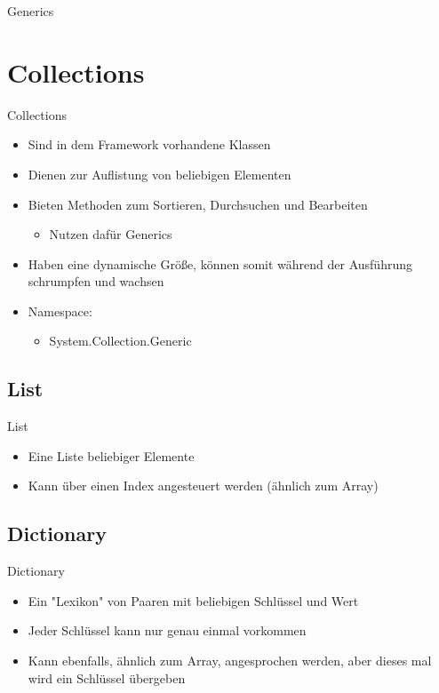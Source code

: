 \begin{frame}{Generics}
	
	
\end{frame}

\section{Collections}
\begin{frame}{Collections}
	\begin{itemize}
		\item Sind in dem Framework vorhandene Klassen
		\item Dienen zur Auflistung von beliebigen Elementen
		\item Bieten Methoden zum Sortieren, Durchsuchen und Bearbeiten
		\begin{itemize}
			\item Nutzen dafür Generics
		\end{itemize}
		\item Haben eine dynamische Größe, können somit während der Ausführung schrumpfen und wachsen
		\item Namespace:
		\begin{itemize}			
			\item \alert{System.Collection.Generic}
		\end{itemize}
	\end{itemize}
\end{frame}

\subsection{List}
\begin{frame}{List}
	\begin{itemize}
		\item Eine Liste beliebiger Elemente
		\item Kann über einen Index angesteuert werden (ähnlich zum Array)
	\end{itemize}
	
\end{frame}

\subsection{Dictionary}
\begin{frame}{Dictionary}
	\begin{itemize}
		\item Ein "Lexikon" von Paaren mit beliebigen Schlüssel und Wert
		\item Jeder Schlüssel kann nur genau einmal vorkommen
		\item Kann ebenfalls, ähnlich zum Array, angesprochen werden, aber dieses mal wird ein Schlüssel übergeben
	\end{itemize}
	
\end{frame}

